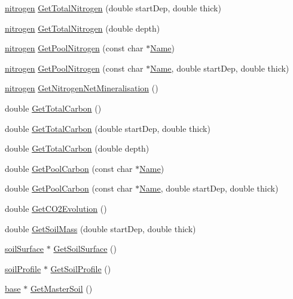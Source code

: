 \begin{DoxyCompactItemize}
\item 
\hyperlink{classnitrogen}{nitrogen} \hyperlink{classsoil_ae8d39d1c2f75f1aee237f657f7ac736d}{GetTotalNitrogen} (double startDep, double thick)
\item 
\hyperlink{classnitrogen}{nitrogen} \hyperlink{classsoil_a1ffeaf9576f8a6b9f09da84e921647d1}{GetTotalNitrogen} (double depth)
\item 
\hyperlink{classnitrogen}{nitrogen} \hyperlink{classsoil_a3ff1423ec9878c087c999958e2a91961}{GetPoolNitrogen} (const char $\ast$\hyperlink{classbase_abd8f99d007cb1914c0837488829974ec}{Name})
\item 
\hyperlink{classnitrogen}{nitrogen} \hyperlink{classsoil_a3fecfad808499426b79dc29f2bfad3cb}{GetPoolNitrogen} (const char $\ast$\hyperlink{classbase_abd8f99d007cb1914c0837488829974ec}{Name}, double startDep, double thick)
\item 
\hyperlink{classnitrogen}{nitrogen} \hyperlink{classsoil_a4d458777f5a0258b5459ece35f00121d}{GetNitrogenNetMineralisation} ()
\item 
double \hyperlink{classsoil_a317255eb34e9a0abe806adb08b236b9e}{GetTotalCarbon} ()
\item 
double \hyperlink{classsoil_a8f72cbbd1c353fe6b889dfdb16c341e4}{GetTotalCarbon} (double startDep, double thick)
\item 
double \hyperlink{classsoil_abc702757f606501ec347fe5ee048da99}{GetTotalCarbon} (double depth)
\item 
double \hyperlink{classsoil_ad10beb6240ba008a5e97b86f084fbd7d}{GetPoolCarbon} (const char $\ast$\hyperlink{classbase_abd8f99d007cb1914c0837488829974ec}{Name})
\item 
double \hyperlink{classsoil_a9e5128bdf857aedf7ab6dd2e12783873}{GetPoolCarbon} (const char $\ast$\hyperlink{classbase_abd8f99d007cb1914c0837488829974ec}{Name}, double startDep, double thick)
\item 
double \hyperlink{classsoil_a8a7cf5f2dd1ac2b9fa3b99f25e91d187}{GetCO2Evolution} ()
\item 
double \hyperlink{classsoil_ae21ef6025f587046d6de1304cb9d1dad}{GetSoilMass} (double startDep, double thick)
\item 
\hyperlink{classsoil_surface}{soilSurface} $\ast$ \hyperlink{classsoil_af438d2978a46a31b4ea15e13d23fd98d}{GetSoilSurface} ()
\item 
\hyperlink{classsoil_profile}{soilProfile} $\ast$ \hyperlink{classsoil_a07a04782ac233c63f2f2246f89fb15c6}{GetSoilProfile} ()
\item 
\hyperlink{classbase}{base} $\ast$ \hyperlink{classsoil_a5735cf071bd7f3682a872fb971df00d7}{GetMasterSoil} ()

\end{DoxyCompactItemize}
